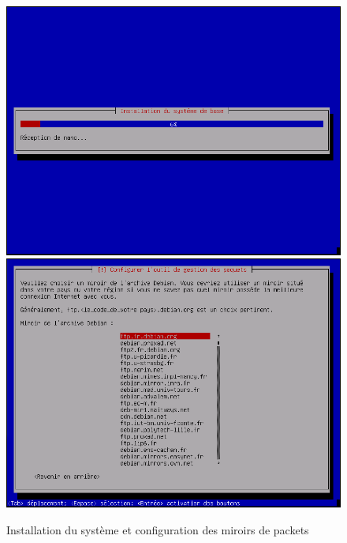 \begin{figure}
 \includegraphics[scale=0.35]{img/install/Deb_inst_13.png}
 \includegraphics[scale=0.35]{img/install/Deb_inst_14.png}
 \caption{Installation du système et configuration des miroirs de packets}
\end{figure}
